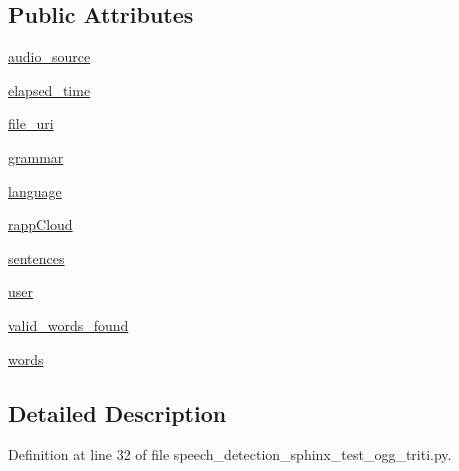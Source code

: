 \subsection*{Public Attributes}
\begin{DoxyCompactItemize}
\item 
\hyperlink{classspeech__detection__sphinx__test__ogg__triti_1_1RappInterfaceTest_a356b321157a7203af4dbb9592e90a43b}{audio\-\_\-source}
\item 
\hyperlink{classspeech__detection__sphinx__test__ogg__triti_1_1RappInterfaceTest_ac9f45476720710babd099d31b4163fb3}{elapsed\-\_\-time}
\item 
\hyperlink{classspeech__detection__sphinx__test__ogg__triti_1_1RappInterfaceTest_a8ae9d9b1ad54407d709325d82b7d0bfc}{file\-\_\-uri}
\item 
\hyperlink{classspeech__detection__sphinx__test__ogg__triti_1_1RappInterfaceTest_ac5c7056693efee590cd423288b3689e0}{grammar}
\item 
\hyperlink{classspeech__detection__sphinx__test__ogg__triti_1_1RappInterfaceTest_a905ac8b933d70d0bb4adb4432c20381b}{language}
\item 
\hyperlink{classspeech__detection__sphinx__test__ogg__triti_1_1RappInterfaceTest_a89ee1e7971a02d77a466eeb1745b1fff}{rapp\-Cloud}
\item 
\hyperlink{classspeech__detection__sphinx__test__ogg__triti_1_1RappInterfaceTest_a308ec870554c450147d601a3a226205a}{sentences}
\item 
\hyperlink{classspeech__detection__sphinx__test__ogg__triti_1_1RappInterfaceTest_a1a408421731507ad94724de6b9a46ac6}{user}
\item 
\hyperlink{classspeech__detection__sphinx__test__ogg__triti_1_1RappInterfaceTest_ae3fe6a3bbd709b9c314aad0ab8368d2f}{valid\-\_\-words\-\_\-found}
\item 
\hyperlink{classspeech__detection__sphinx__test__ogg__triti_1_1RappInterfaceTest_adb592a75b793940b89a3c6ac1bf79ebe}{words}
\end{DoxyCompactItemize}


\subsection{Detailed Description}


Definition at line 32 of file speech\-\_\-detection\-\_\-sphinx\-\_\-test\-\_\-ogg\-\_\-triti.\-py.




